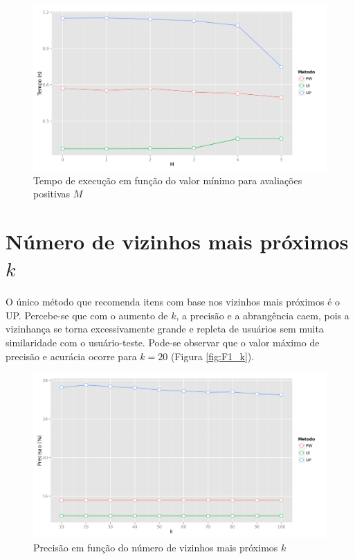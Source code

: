 \begin{figure}[htp]
    \begin{center}
    \includegraphics[width=1\textwidth]{img/time_M}
    \end{center}
    \caption{Tempo de execução em função do valor mínimo para avaliações positivas $M$}
    \label{fig:time_M}
\end{figure}

\section{Número de vizinhos mais próximos $k$} %
\label{sec:n_mero_de_vizinhos_mais_pr_ximos_}

O único método que recomenda itens com base nos vizinhos mais próximos é o UP. Percebe-se que com o aumento de $k$, a precisão e a abrangência caem, pois a vizinhança se torna excessivamente grande e repleta de usuários sem muita similaridade com o usuário-teste. Pode-se observar que o valor máximo de precisão e acurácia ocorre para $k=20$ (Figura \ref{fig:F1_k}).

\begin{figure}[htp]
    \begin{center}
    \includegraphics[width=1\textwidth]{img/precision_k}
    \end{center}
    \caption{Precisão em função do número de vizinhos mais próximos $k$}
    \label{fig:precision_k}
\end{figure}


